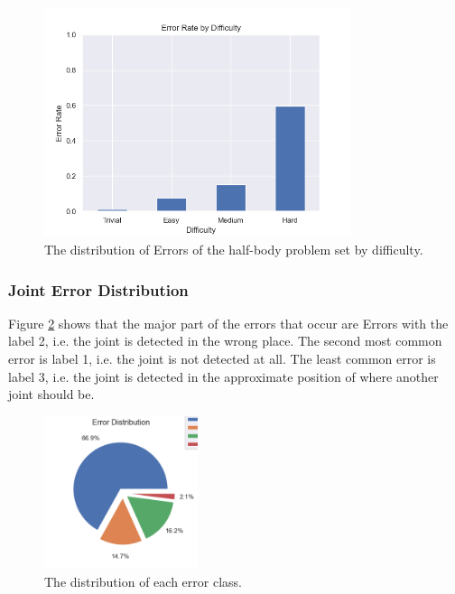 \begin{figure}
  \centering
  \includegraphics[width=0.8\textwidth]{figures/Data/dist_limbs/Error_Rate_by_Difficulty.png}
  \caption[Error Distribution of the limbs by difficulty]{The distribution of Errors of the half-body problem set by difficulty.}
  \label{fig:lb_diff_dist}
\end{figure}

\subsubsection{Joint Error Distribution}

Figure \ref{fig:jt_pie} shows that the major part of the errors that occur are Errors with the label 2, i.e. the joint is detected in the wrong place. The second most common error is label 1, i.e. the joint is not detected at all. The least common error is label 3, i.e. the joint is detected in the approximate position of where another joint should be.

\begin{figure}
  \centering
  \includegraphics[width=0.4\textwidth]{figures/Data/dist_joints/Error_Distribution.png}
  \caption[Error Distribution for each error class]{The distribution of each error class.}
  \label{fig:jt_pie}
\end{figure}

